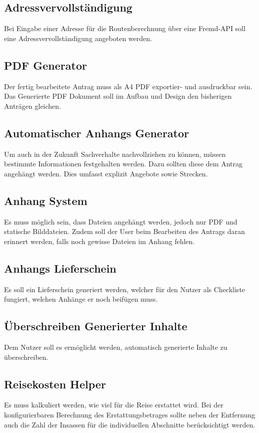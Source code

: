 \subsection{Adressvervollständigung}\label{subsec:adressvervollstandigung}
Bei Eingabe einer Adresse für die Routenberechnung über eine Fremd-\ac{API} soll eine Adressvervollständigung angeboten werden.
\subsection{\ac{PDF} Generator}\label{subsec:pdf-generator}
Der fertig bearbeitete Antrag muss als A4 \ac{PDF} exportier- und ausdruckbar sein.
Das Generierte \ac{PDF} Dokument soll im Aufbau und Design den bisherigen Anträgen gleichen.
\subsection{Automatischer Anhangs Generator}\label{subsec:automatischer-anhangs-generator}
Um auch in der Zukunft Sachverhalte nachvollziehen zu können, müssen bestimmte Informationen festgehalten werden.
Dazu sollten diese dem Antrag angehängt werden.
Dies umfasst explizit Angebote sowie Strecken.
\subsection{Anhang System}\label{subsec:anhang-system}
Es muss möglich sein, dass Dateien angehängt werden, jedoch nur \ac{PDF} und statische Bilddateien.
Zudem soll der User beim Bearbeiten des Antrags daran erinnert werden, falls noch gewisse Dateien im Anhang fehlen.
\subsection{Anhangs Lieferschein}\label{subsec:anhangs-lieferschein}
Es soll ein Lieferschein generiert werden, welcher für den Nutzer als Checkliste fungiert, welchen Anhänge er noch beifügen muss.
\subsection{Überschreiben Generierter Inhalte}\label{subsec:uberschreiben-generierter-inhalte}
Dem Nutzer soll es ermöglicht werden, automatisch generierte Inhalte zu überschreiben.
\subsection{Reisekosten Helper}\label{subsec:reisekosten-helper}
Es muss kalkuliert werden, wie viel für die Reise erstattet wird.
Bei der konfigurierbaren Berechnung des Erstattungsbetrages sollte neben der Entfernung auch die Zahl der Insassen für
die individuellen Abschnitte berücksichtigt werden.

